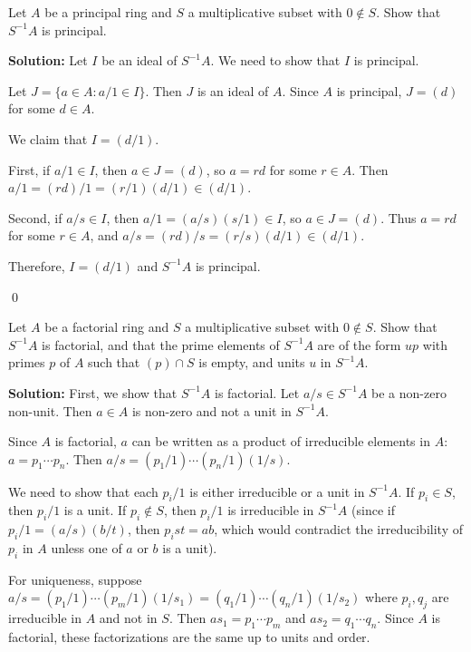 \begin{problembox}
Let $A$ be a principal ring and $S$ a multiplicative subset with $0 \notin S$. Show that $S^{-1}A$ is principal.
\end{problembox}

\noindent\textbf{Solution:}
Let $I$ be an ideal of $S^{-1}A$. We need to show that $I$ is principal.

Let $J = \{a \in A : a/1 \in I\}$. Then $J$ is an ideal of $A$. Since $A$ is principal, $J = (d)$ for some $d \in A$.

We claim that $I = (d/1)$. 

First, if $a/1 \in I$, then $a \in J = (d)$, so $a = rd$ for some $r \in A$. Then $a/1 = (rd)/1 = (r/1)(d/1) \in (d/1)$.

Second, if $a/s \in I$, then $a/1 = (a/s)(s/1) \in I$, so $a \in J = (d)$. Thus $a = rd$ for some $r \in A$, and $a/s = (rd)/s = (r/s)(d/1) \in (d/1)$.

Therefore, $I = (d/1)$ and $S^{-1}A$ is principal.


\qed
\begin{problembox}
Let $A$ be a factorial ring and $S$ a multiplicative subset with $0 \notin S$. Show that $S^{-1}A$ is factorial, and that the prime elements of $S^{-1}A$ are of the form $up$ with primes $p$ of $A$ such that $(p) \cap S$ is empty, and units $u$ in $S^{-1}A$.
\end{problembox}

\noindent\textbf{Solution:}
First, we show that $S^{-1}A$ is factorial. Let $a/s \in S^{-1}A$ be a non-zero non-unit. Then $a \in A$ is non-zero and not a unit in $S^{-1}A$.

Since $A$ is factorial, $a$ can be written as a product of irreducible elements in $A$: $a = p_1 \cdots p_n$. Then $a/s = (p_1/1) \cdots (p_n/1)(1/s)$.

We need to show that each $p_i/1$ is either irreducible or a unit in $S^{-1}A$. If $p_i \in S$, then $p_i/1$ is a unit. If $p_i \notin S$, then $p_i/1$ is irreducible in $S^{-1}A$ (since if $p_i/1 = (a/s)(b/t)$, then $p_i st = ab$, which would contradict the irreducibility of $p_i$ in $A$ unless one of $a$ or $b$ is a unit).

For uniqueness, suppose $a/s = (p_1/1) \cdots (p_m/1)(1/s_1) = (q_1/1) \cdots (q_n/1)(1/s_2)$ where $p_i, q_j$ are irreducible in $A$ and not in $S$. Then $a s_1 = p_1 \cdots p_m$ and $a s_2 = q_1 \cdots q_n$. Since $A$ is factorial, these factorizations are the same up to units and order.

